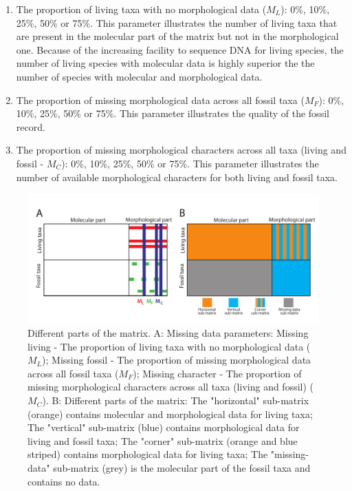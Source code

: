 \documentclass[12pt,letterpaper]{article}
\begin{document}
\begin{enumerate}
\item{The proportion of living taxa with no morphological data ($M_{L}$): 0\%, 10\%, 25\%, 50\% or 75\%.}
This parameter illustrates the number of living taxa that are present in the molecular part of the matrix but not in the morphological one.
Because of the increasing facility to sequence DNA for living species, the number of living species with molecular data is highly superior the the number of species with molecular and morphological data.
\item{The proportion of missing morphological data across all fossil taxa ($M_{F}$): 0\%, 10\%, 25\%, 50\% or 75\%.}
This parameter illustrates the quality of the fossil record. 
\item{The proportion of missing morphological characters across all taxa (living and fossil - $M_{C}$): 0\%, 10\%, 25\%, 50\% or 75\%. }
This parameter illustrates the number of available morphological characters for both living and fossil taxa.
\end{enumerate}

\begin{figure}
\centering
\includegraphics[keepaspectratio=true]{Figures/TEM_Fig_missingData.pdf}
\caption{Different parts of the matrix. %
A: Missing data parameters:
Missing living - The proportion of living taxa with no morphological data ($M_{L}$);
Missing fossil - The proportion of missing morphological data across all fossil taxa ($M_{F}$);
Missing character - The proportion of missing morphological characters across all taxa (living and fossil) ($M_{C}$).
B: Different parts of the matrix:
The "horizontal" sub-matrix (orange) contains molecular and morphological data for living taxa;
The "vertical" sub-matrix (blue) contains morphological data for living and fossil taxa;
The "corner" sub-matrix (orange and blue striped) contains morphological data for living taxa;
The "missing-data" sub-matrix (grey) is the molecular part of the fossil taxa and contains no data.}
\label{Fig_RemoveData}
\end{figure}
\end{document}
